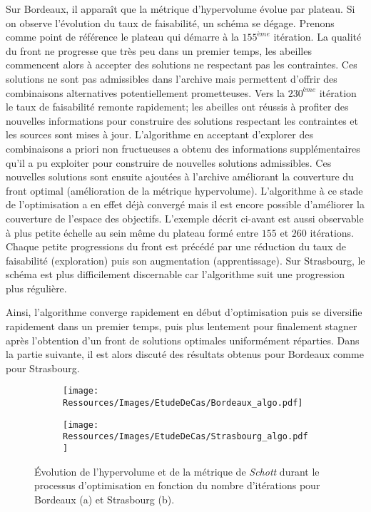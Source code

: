 Sur Bordeaux, il apparaît que la métrique d’hypervolume évolue par plateau. Si on observe
l’évolution du taux de faisabilité, un schéma se dégage. Prenons comme point de référence
le plateau qui démarre à la $155^{ème}$ itération. La qualité du front ne progresse que
très peu dans un premier temps, les abeilles commencent alors à accepter des solutions ne
respectant pas les contraintes. Ces solutions ne sont pas admissibles dans l’archive mais
permettent d’offrir des combinaisons alternatives potentiellement prometteuses. Vers la
$230^{ème}$ itération le taux de faisabilité remonte rapidement; les abeilles ont réussis à
profiter des nouvelles informations pour construire des solutions respectant les
contraintes et les sources sont mises à jour. L’algorithme en acceptant d’explorer des
combinaisons a priori non fructueuses a obtenu des informations supplémentaires
qu’il a pu exploiter pour construire de nouvelles solutions admissibles. Ces nouvelles
solutions sont ensuite ajoutées à l’archive améliorant la couverture du front optimal
(amélioration de la métrique hypervolume). L’algorithme à ce stade de l’optimisation a en
effet déjà convergé mais il est encore possible d’améliorer la couverture de l’espace des
objectifs.
L’exemple décrit ci-avant est aussi observable à plus petite échelle au sein même du plateau
formé entre $155$ et $260$ itérations. Chaque petite progressions du front est précédé par
une réduction du taux de faisabilité (exploration) puis son augmentation (apprentissage).
Sur Strasbourg, le schéma est plus difficilement discernable car l’algorithme suit une
progression plus régulière.

Ainsi, l’algorithme converge rapidement en début d’optimisation puis se diversifie
rapidement dans un premier temps, puis plus lentement pour finalement stagner après
l’obtention d’un front de solutions optimales uniformément réparties. Dans la partie
suivante, il est alors discuté des résultats obtenus pour Bordeaux comme pour
Strasbourg.

\begin{figure}
    \centering
    \begin{subfigure}[b]{0.48\textwidth}
        \centering
        \texttt{[image: Ressources/Images/EtudeDeCas/Bordeaux\_algo.pdf]}
        \caption{}
        \label{fig:hypervolume_schott_bor}
    \end{subfigure}
    \quad
    \begin{subfigure}[b]{0.48\textwidth}
        \centering
        \texttt{[image: Ressources/Images/EtudeDeCas/Strasbourg\_algo.pdf]}
        \caption{}
        \label{fig:hypervolume_schottstras}
    \end{subfigure}
    \caption[Évolution de la convergence et de la diversification de l’optimisation]
             {Évolution de l’hypervolume et de la métrique de \textit{Schott}
              durant le processus d’optimisation en fonction du nombre d’itérations pour
              Bordeaux (a) et Strasbourg (b).}
    \label{fig:hypervolume_schott_front}
\end{figure}




